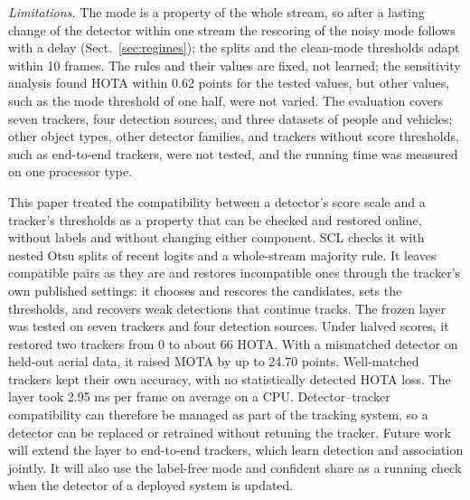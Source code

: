 \documentclass[pdflatex,sn-mathphys-num,iicol]{sn-jnl}
\makeatletter
\newcommand{\scl}{SCL}
\renewcommand\section{\@startsection{section}{1}{\z@}{-10pt \@plus -3pt \@minus -2pt}{6pt}{\sectionfont}}
\makeatother
\begin{document}
\emph{Limitations.} The mode is a property of the whole stream, so after a lasting change of the
detector within one stream the rescoring of the noisy mode follows with a delay
(Sect.~\ref{sec:regimes}); the splits and the clean-mode thresholds adapt within 10 frames. The
rules and their values are fixed, not learned; the sensitivity analysis found HOTA within 0.62
points for the tested values, but other values, such as the mode threshold of one half, were not
varied. The evaluation covers seven trackers, four detection sources, and three datasets of people
and vehicles; other object types, other detector families, and trackers without score thresholds,
such as end-to-end trackers, were not tested, and the running time was measured on one processor
type.
\FloatBarrier
\section{Conclusion}\label{sec:conclusion}

This paper treated the compatibility between a detector's score scale and a tracker's thresholds
as a property that can be checked and restored online, without labels and without changing either
component. \scl{} checks it with nested Otsu splits of recent logits and a whole-stream majority
rule. It leaves compatible pairs as they are and restores incompatible ones through the tracker's
own published settings: it chooses and rescores the candidates, sets the thresholds, and recovers
weak detections that continue tracks. The frozen layer was tested on seven trackers and four
detection sources. Under halved scores, it restored two trackers from 0 to about 66 HOTA. With a
mismatched detector on held-out aerial data, it raised MOTA by up to 24.70 points. Well-matched
trackers kept their own accuracy, with no statistically detected HOTA loss. The layer took 2.95 ms
per frame on average on a CPU. Detector--tracker compatibility can therefore be managed as part of
the tracking system, so a detector can be replaced or retrained without retuning the tracker.
Future work will extend the layer to end-to-end trackers, which learn detection and association
jointly. It will also use the label-free mode and confident share as a running check when the
detector of a deployed system is updated.

\FloatBarrier
\backmatter

\makeatletter\def\bibfont{\reset@font\fontfamily{\rmdefault}\footnotesize\selectfont}\makeatother
\setlength{\bibsep}{2pt plus 1pt}
\end{document}
